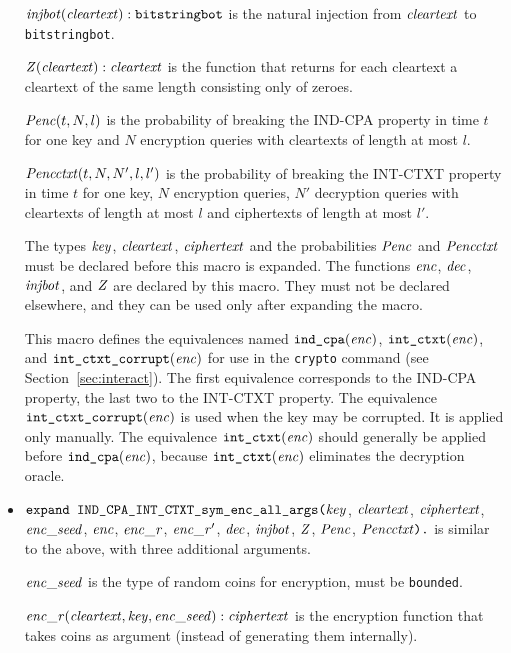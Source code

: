 \documentclass{article}
\begin{document}
\begin{itemize}
   $\mathit{injbot}(\mathit{cleartext}): \texttt{bitstringbot}$ is the natural
  injection from $\mathit{cleartext}$ to \texttt{bitstringbot}.

   $\mathit{Z}(\mathit{cleartext}): \mathit{cleartext}$ is the function that
  returns for each cleartext a cleartext of the same length consisting
  only of zeroes.

  $\mathit{Penc}(t, N, l)$ is the probability of breaking the IND-CPA
  property in time $t$ for one key and $N$ encryption queries with
  cleartexts of length at most $l$.

  $\mathit{Pencctxt}(t, N, N', l, l')$ is the probability of breaking the
  INT-CTXT property in time $t$ for one key, $N$ encryption queries,
  $N'$ decryption queries with cleartexts of length at most $l$ and
  ciphertexts of length at most $l'$.

   The types $\mathit{key}$, $\mathit{cleartext}$,
   $\mathit{ciphertext}$ and the probabilities $\mathit{Penc}$ and $\mathit{Pencctxt}$ must
   be declared before this macro is expanded. The functions
   $\mathit{enc}$, $\mathit{dec}$, $\mathit{injbot}$, and $\mathit{Z}$ are declared by this
   macro. They must not be declared elsewhere, and they can be used
   only after expanding the macro.

   This macro defines the equivalences named $\texttt{ind\_cpa}(\mathit{enc})$,
   $\texttt{int\_ctxt}(\mathit{enc})$, and $\texttt{int\_ctxt\_corrupt}(\mathit{enc})$ 
   for use in the \texttt{crypto} command 
   (see Section~\ref{sec:interact}). 
   The first equivalence corresponds to the
   IND-CPA property, the last two to the INT-CTXT property.
   The equivalence $\texttt{int\_ctxt\_corrupt}(\mathit{enc})$ is used when the
   key may be corrupted. It is applied only manually.
   The equivalence $\texttt{int\_ctxt}(\mathit{enc})$
   should generally be applied before $\texttt{ind\_cpa}(\mathit{enc})$,
   because $\texttt{int\_ctxt}(\mathit{enc})$ eliminates the decryption oracle.

\item $\texttt{expand IND\_CPA\_INT\_CTXT\_sym\_enc\_all\_args(}\mathit{key}$,
$  \mathit{cleartext}$, $\mathit{ciphertext}$, $\mathit{enc\_seed}$, $\mathit{enc}$, $\mathit{enc\_r}$, $\mathit{enc\_r}'$,
$  \mathit{dec}$, $\mathit{injbot}$, $\mathit{Z}$, $\mathit{Penc}$, $\mathit{Pencctxt}\texttt{).}$  is similar to the above,
  with three additional arguments. 

  $\mathit{enc\_seed}$ is the type of random coins for encryption, must be \texttt{bounded}.

  $\mathit{enc\_r}(\mathit{cleartext}, \mathit{key}, \mathit{enc\_seed}): \mathit{ciphertext}$ is the encryption function that takes coins as argument (instead of generating them internally).


\end{itemize}
\end{document}
